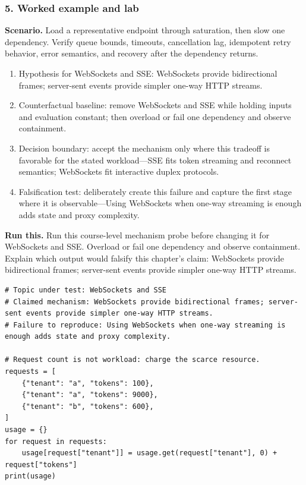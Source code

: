 \subsubsection*{5. Worked example and lab}
\textbf{Scenario.} Load a representative endpoint through saturation, then slow one dependency. Verify queue bounds, timeouts, cancellation lag, idempotent retry behavior, error semantics, and recovery after the dependency returns.
\begin{enumerate}
\item Hypothesis for WebSockets and SSE: WebSockets provide bidirectional frames; server-sent events provide simpler one-way HTTP streams.
\item Counterfactual baseline: remove WebSockets and SSE while holding inputs and evaluation constant; then overload or fail one dependency and observe containment.
\item Decision boundary: accept the mechanism only where this tradeoff is favorable for the stated workload—SSE fits token streaming and reconnect semantics; WebSockets fit interactive duplex protocols.
\item Falsification test: deliberately create this failure and capture the first stage where it is observable—Using WebSockets when one-way streaming is enough adds state and proxy complexity.
\end{enumerate}
\textbf{Run this.} Run this course-level mechanism probe before changing it for WebSockets and SSE. Overload or fail one dependency and observe containment. Explain which output would falsify this chapter's claim: WebSockets provide bidirectional frames; server-sent events provide simpler one-way HTTP streams.
\begin{Verbatim}[fontsize=\scriptsize]
# Topic under test: WebSockets and SSE
# Claimed mechanism: WebSockets provide bidirectional frames; server-sent events provide simpler one-way HTTP streams.
# Failure to reproduce: Using WebSockets when one-way streaming is enough adds state and proxy complexity.

# Request count is not workload: charge the scarce resource.
requests = [
    {"tenant": "a", "tokens": 100},
    {"tenant": "a", "tokens": 9000},
    {"tenant": "b", "tokens": 600},
]
usage = {}
for request in requests:
    usage[request["tenant"]] = usage.get(request["tenant"], 0) + request["tokens"]
print(usage)
\end{Verbatim}
